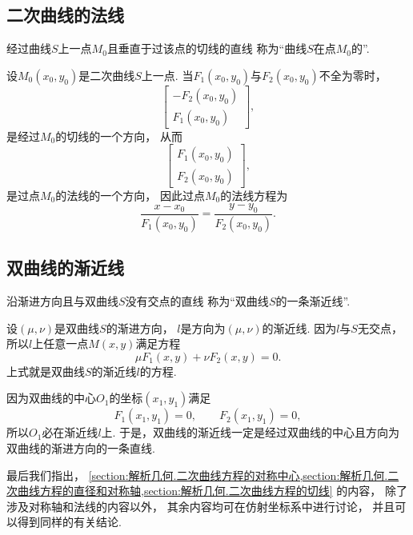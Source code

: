 \subsection{二次曲线的法线}
\begin{definition}
经过曲线\(S\)上一点\(M_0\)且垂直于过该点的切线的直线
称为“曲线\(S\)在点\(M_0\)的”.
\end{definition}

设\(M_0(x_0,y_0)\)是二次曲线\(S\)上一点.
当\(F_1(x_0,y_0)\)与\(F_2(x_0,y_0)\)不全为零时，
\begin{equation*}
	\begin{bmatrix}
		-F_2(x_0,y_0) \\
		F_1(x_0,y_0)
	\end{bmatrix},
\end{equation*}
是经过\(M_0\)的切线的一个方向，
从而\begin{equation*}
	\begin{bmatrix}
		F_1(x_0,y_0) \\
		F_2(x_0,y_0)
	\end{bmatrix},
\end{equation*}
是过点\(M_0\)的法线的一个方向，
因此过点\(M_0\)的法线方程为\begin{equation}
	\frac{x-x_0}{F_1(x_0,y_0)}
	= \frac{y-y_0}{F_2(x_0,y_0)}.
\end{equation}

\subsection{双曲线的渐近线}
\begin{definition}
沿渐进方向且与双曲线\(S\)没有交点的直线
称为“双曲线\(S\)的一条渐近线”.
\end{definition}

设\((\mu,\nu)\)是双曲线\(S\)的渐进方向，
\(l\)是方向为\((\mu,\nu)\)的渐近线.
因为\(l\)与\(S\)无交点，
所以\(l\)上任意一点\(M(x,y)\)满足方程\begin{equation}
	\mu F_1(x,y) + \nu F_2(x,y) = 0.
\end{equation}
上式就是双曲线\(S\)的渐近线\(l\)的方程.

因为双曲线的中心\(O_1\)的坐标\((x_1,y_1)\)满足\begin{equation*}
	F_1(x_1,y_1) = 0,
	\qquad
	F_2(x_1,y_1) = 0,
\end{equation*}
所以\(O_1\)必在渐近线\(l\)上.
于是，双曲线的渐近线一定是经过双曲线的中心且方向为双曲线的渐进方向的一条直线.

\begin{remark}
最后我们指出，
\cref{section:解析几何.二次曲线方程的对称中心,section:解析几何.二次曲线方程的直径和对称轴,section:解析几何.二次曲线方程的切线} 的内容，
除了涉及对称轴和法线的内容以外，
其余内容均可在仿射坐标系中进行讨论，
并且可以得到同样的有关结论.
\end{remark}
